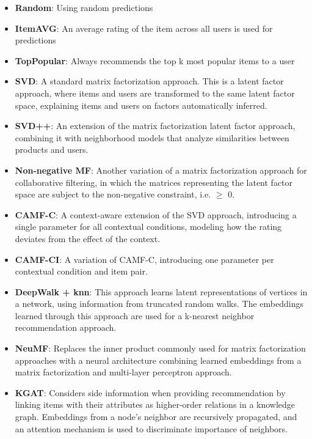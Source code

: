 \begin{itemize}
    \item \textbf{Random}: Using random predictions
    \item \textbf{ItemAVG}: An average rating of the item across all users is used for predictions
    \item \textbf{TopPopular}: Always recommends the top k most popular items to a user
    \item \textbf{SVD\cite{standardMF}}: A standard matrix factorization approach. This is a latent factor approach, where items and users are transformed to the same latent factor space, explaining items and users on factors automatically inferred.
    \item \textbf{SVD++\cite{svd++}}: An extension of the matrix factorization latent factor approach, combining it with neighborhood models that analyze similarities between products and users.
    \item \textbf{Non-negative MF\cite{NMF}}: Another variation of a matrix factorization approach for collaborative filtering, in which the matrices representing the latent factor space are subject to the non-negative constraint, i.e. $\geq$ 0.
    \item \textbf{CAMF-C\cite{baltrunasCAMF}}: A context-aware extension of the SVD approach, introducing a single parameter for all contextual conditions, modeling how the rating deviates from the effect of the context.
    \item \textbf{CAMF-CI\cite{baltrunasCAMF}}: A variation of CAMF-C, introducing one parameter per contextual condition and item pair.
    \item \textbf{DeepWalk + knn\cite{DeepWalk}}: This approach learns latent representations of vertices in a network, using information from truncated random walks. The embeddings learned through this approach are used for a k-nearest neighbor recommendation approach.
    \item \textbf{NeuMF\cite{neuMF}}: Replaces the inner product commonly used for matrix factorization approaches with a neural architecture combining learned embeddings from a matrix factorization and multi-layer perceptron approach.
    \item \textbf{KGAT\cite{KGAT}}: Considers side information when providing recommendation by linking items with their attributes as higher-order relations in a knowledge graph. Embeddings from a node's neighbor are recursively propagated, and an attention mechanism is used to discriminate importance of neighbors.

\end{itemize}
